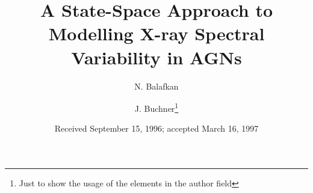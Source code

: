 \documentclass{aa}
\begin{document}
 


   \title{A State-Space Approach to Modelling X-ray Spectral Variability in AGNs}


   \author{N. Balafkan
          \and
          J. Buchner\fnmsep\thanks{Just to show the usage
          of the elements in the author field}
          }


   \date{Received September 15, 1996; accepted March 16, 1997}

 
\end{document}
